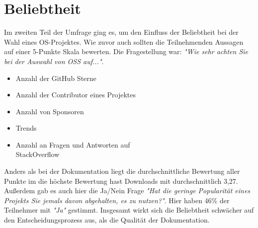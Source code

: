 \cleardoublepage %

\section{Beliebtheit}\label{sec:Beliebtheit}
Im zweiten Teil der Umfrage ging es, um den Einfluss der Beliebtheit bei der Wahl eines OS-Projektes.
Wie zuvor auch sollten die Teilnehmenden Aussagen auf einer 5-Punkte Skala bewerten.
Die Fragestellung war: \textit{"Wie sehr achten Sie bei der Auswahl von OSS auf..."}.


\begin{multicols}{2}
    \begin{itemize}
        \setlength\itemsep{0em}
        \item Anzahl der GitHub Sterne
        \item Anzahl der Contributor eines
              Projektes
        \item Anzahl von Sponsoren
        \item Trends
        \item Anzahl an Fragen und Antworten auf\\ StackOverflow
    \end{itemize}
\end{multicols}

\noindent
{}




\bigskip
\noindent
Anders als bei der Dokumentation liegt die durchschnittliche Bewertung aller Punkte im 
die höchste Bewertung hast Downloads mit durchschnittlich 3,27.
Außerdem gab es auch hier die Ja/Nein Frage \textit{"Hat die geringe Popularität eines Projekts Sie
    jemals davon abgehalten, es zu nutzen?"}. Hier haben 46\% der Teilnehmer mit \textit{"Ja"} gestimmt.
Insgesamt wirkt sich die Beliebtheit schwächer auf den Entscheidungsprozess aus, als die Qualität der
Dokumentation.

